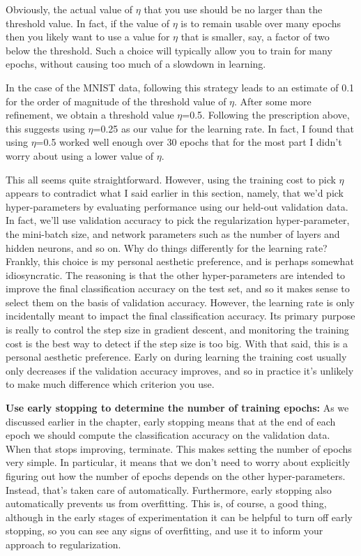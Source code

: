 Obviously, the actual value of $\eta$ that you use should be no larger than the threshold value. In fact, if the value of $\eta$ is to remain usable over many epochs then you likely want to use a value for $\eta$ that is smaller, say, a factor of two below the threshold. Such a choice will typically allow you to train for many epochs, without causing too much of a slowdown in learning.

In the case of the MNIST data, following this strategy leads to an estimate of 0.1 for the order of magnitude of the threshold value of $\eta$. After some more refinement, we obtain a threshold value $\eta$=0.5. Following the prescription above, this suggests using $\eta$=0.25 as our value for the learning rate. In fact, I found that using $\eta$=0.5 worked well enough over 30 epochs that for the most part I didn't worry about using a lower value of $\eta$.

This all seems quite straightforward. However, using the training cost to pick $\eta$ appears to contradict what I said earlier in this section, namely, that we'd pick hyper-parameters by evaluating performance using our held-out validation data. In fact, we'll use validation accuracy to pick the regularization hyper-parameter, the mini-batch size, and network parameters such as the number of layers and hidden neurons, and so on. Why do things differently for the learning rate? Frankly, this choice is my personal aesthetic preference, and is perhaps somewhat idiosyncratic. The reasoning is that the other hyper-parameters are intended to improve the final classification accuracy on the test set, and so it makes sense to select them on the basis of validation accuracy. However, the learning rate is only incidentally meant to impact the final classification accuracy. Its primary purpose is really to control the step size in gradient descent, and monitoring the training cost is the best way to detect if the step size is too big. With that said, this is a personal aesthetic preference. Early on during learning the training cost usually only decreases if the validation accuracy improves, and so in practice it's unlikely to make much difference which criterion you use.

\textbf{Use early stopping to determine the number of training epochs:} As we discussed earlier in the chapter, early stopping means that at the end of each epoch we should compute the classification accuracy on the validation data. When that stops improving, terminate. This makes setting the number of epochs very simple. In particular, it means that we don't need to worry about explicitly figuring out how the number of epochs depends on the other hyper-parameters. Instead, that's taken care of automatically. Furthermore, early stopping also automatically prevents us from overfitting. This is, of course, a good thing, although in the early stages of experimentation it can be helpful to turn off early stopping, so you can see any signs of overfitting, and use it to inform your approach to regularization.


